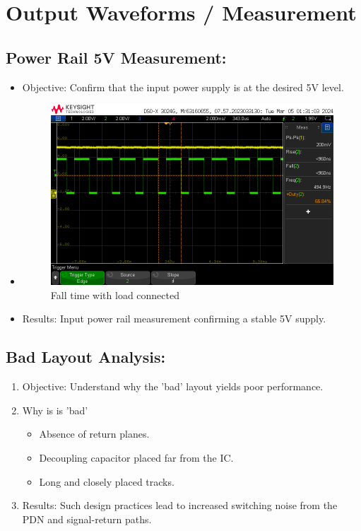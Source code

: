 \documentclass[a4paper,11pt]{article}%
\begin{document}
\section{Output Waveforms / Measurement}

\subsection{Power Rail 5V Measurement:}

\begin{itemize}
	\item Objective: Confirm that the input power supply is at the desired 5V level.
	\item 
	\begin{figure}[H]
		\centering
		\includegraphics[scale=0.6]{figures/scope_0.png}
		\caption{Fall time with load connected}
		\label{scope_0}
	\end{figure}
	\item Results: Input power rail measurement confirming a stable 5V supply.
\end{itemize}


\subsection{Bad Layout Analysis:}
\begin{enumerate}
	\item Objective: Understand why the 'bad' layout yields poor performance.
	\item Why is is 'bad'
	\begin{itemize}
		\item Absence of return planes.
		\item Decoupling capacitor placed far from the IC.
		\item Long and closely placed tracks.
	\end{itemize}
	\item Results:  Such design practices lead to increased switching noise from the PDN and signal-return paths.
\end{enumerate}
\end{document}
